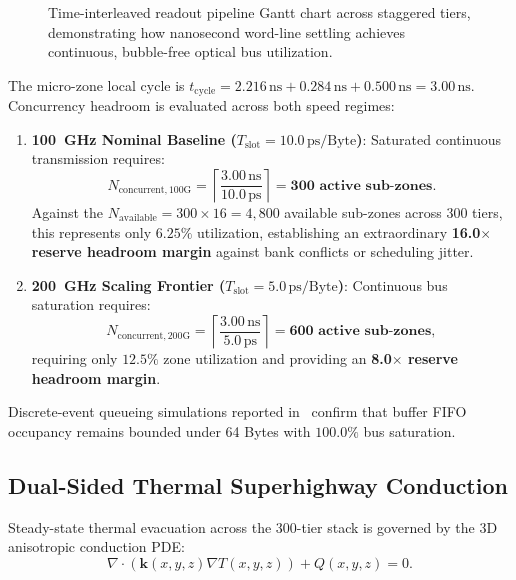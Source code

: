 \documentclass[journal]{IEEEtran}
\begin{document}
\begin{figure}[!t]
{
}
\caption{Time-interleaved readout pipeline Gantt chart across staggered tiers, demonstrating how nanosecond word-line settling achieves continuous, bubble-free optical bus utilization.}
\label{fig:pipeline_gantt}
\end{figure}

The micro-zone local cycle is $t_{\text{cycle}} = 2.216\,\text{ns} + 0.284\,\text{ns} + 0.500\,\text{ns} = 3.00\,\text{ns}$. Concurrency headroom is evaluated across both speed regimes:
\begin{enumerate}
    \item \textbf{100~GHz Nominal Baseline ($T_{\text{slot}} = 10.0\,\text{ps/Byte}$)}: Saturated continuous transmission requires:
    \begin{equation}
        N_{\text{concurrent}, 100\text{G}} = \left\lceil \frac{3.00\,\text{ns}}{10.0\,\text{ps}} \right\rceil = \mathbf{300\text{ active sub-zones}}.
    \end{equation}
    Against the $N_{\text{available}} = 300 \times 16 = 4,800$ available sub-zones across 300 tiers, this represents only $6.25\%$ utilization, establishing an extraordinary \textbf{16.0$\times$ reserve headroom margin} against bank conflicts or scheduling jitter.
    \item \textbf{200~GHz Scaling Frontier ($T_{\text{slot}} = 5.0\,\text{ps/Byte}$)}: Continuous bus saturation requires:
    \begin{equation}
        N_{\text{concurrent}, 200\text{G}} = \left\lceil \frac{3.00\,\text{ns}}{5.0\,\text{ps}} \right\rceil = \mathbf{600\text{ active sub-zones}},
    \end{equation}
    requiring only $12.5\%$ zone utilization and providing an \textbf{8.0$\times$ reserve headroom margin}.
\end{enumerate}

Discrete-event queueing simulations reported in~\cite{omi_sim_report} confirm that buffer FIFO occupancy remains bounded under 64 Bytes with $100.0\%$ bus saturation.

\subsection{Dual-Sided Thermal Superhighway Conduction}
Steady-state thermal evacuation across the 300-tier stack is governed by the 3D anisotropic conduction PDE:
\begin{equation}
    \nabla \cdot (\mathbf{k}(x, y, z) \nabla T(x, y, z)) + Q(x, y, z) = 0.
\end{equation}
\end{document}

